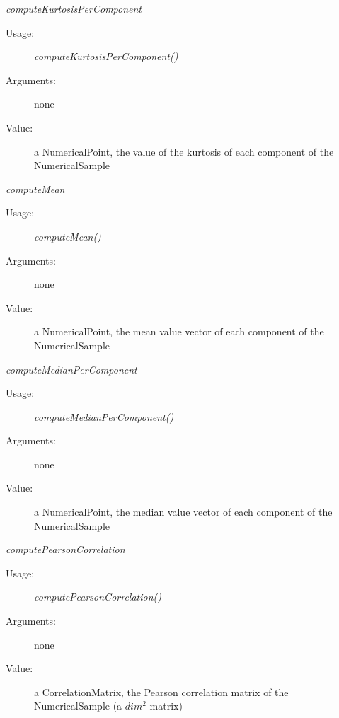 \begin{description}
\begin{description}
\item \textit{computeKurtosisPerComponent}
\begin{description}
\item[Usage:] \textit{computeKurtosisPerComponent()}
\item[Arguments:] none
\item[Value:] a NumericalPoint,  the value of the kurtosis of each component of the NumericalSample
\end{description}
\bigskip

\item \textit{computeMean}
\begin{description}
\item[Usage:] \textit{computeMean()}
\item[Arguments:] none
\item[Value:] a NumericalPoint, the mean value vector of each component of the NumericalSample
\end{description}
\bigskip


\item \textit{computeMedianPerComponent}
\begin{description}
\item[Usage:] \textit{computeMedianPerComponent()}
\item[Arguments:] none
\item[Value:] a NumericalPoint, the median value vector of each component of the NumericalSample
\end{description}
\bigskip

\item \textit{computePearsonCorrelation}
\begin{description}
\item[Usage:] \textit{computePearsonCorrelation()}
\item[Arguments:] none
\item[Value:] a CorrelationMatrix, the Pearson correlation matrix of the NumericalSample (a $dim^2$ matrix)
\end{description}
\bigskip


\end{description}
\end{description}
